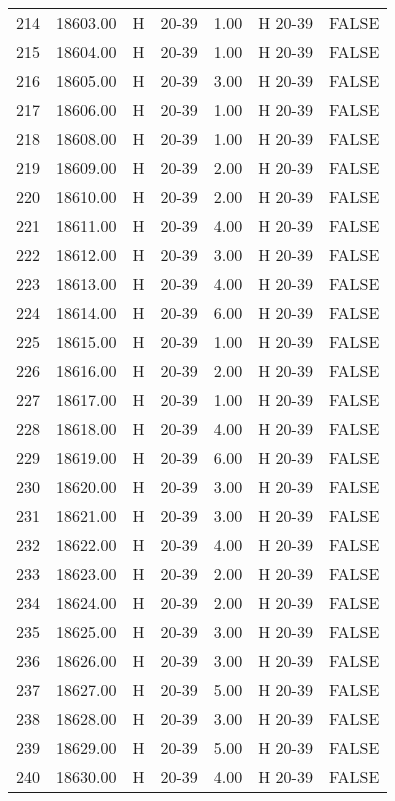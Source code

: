 \begin{table}[ht]
\begin{tabular}{rrllrll}
  214 & 18603.00 & H & 20-39 & 1.00 & H 20-39 & FALSE \\ 
  215 & 18604.00 & H & 20-39 & 1.00 & H 20-39 & FALSE \\ 
  216 & 18605.00 & H & 20-39 & 3.00 & H 20-39 & FALSE \\ 
  217 & 18606.00 & H & 20-39 & 1.00 & H 20-39 & FALSE \\ 
  218 & 18608.00 & H & 20-39 & 1.00 & H 20-39 & FALSE \\ 
  219 & 18609.00 & H & 20-39 & 2.00 & H 20-39 & FALSE \\ 
  220 & 18610.00 & H & 20-39 & 2.00 & H 20-39 & FALSE \\ 
  221 & 18611.00 & H & 20-39 & 4.00 & H 20-39 & FALSE \\ 
  222 & 18612.00 & H & 20-39 & 3.00 & H 20-39 & FALSE \\ 
  223 & 18613.00 & H & 20-39 & 4.00 & H 20-39 & FALSE \\ 
  224 & 18614.00 & H & 20-39 & 6.00 & H 20-39 & FALSE \\ 
  225 & 18615.00 & H & 20-39 & 1.00 & H 20-39 & FALSE \\ 
  226 & 18616.00 & H & 20-39 & 2.00 & H 20-39 & FALSE \\ 
  227 & 18617.00 & H & 20-39 & 1.00 & H 20-39 & FALSE \\ 
  228 & 18618.00 & H & 20-39 & 4.00 & H 20-39 & FALSE \\ 
  229 & 18619.00 & H & 20-39 & 6.00 & H 20-39 & FALSE \\ 
  230 & 18620.00 & H & 20-39 & 3.00 & H 20-39 & FALSE \\ 
  231 & 18621.00 & H & 20-39 & 3.00 & H 20-39 & FALSE \\ 
  232 & 18622.00 & H & 20-39 & 4.00 & H 20-39 & FALSE \\ 
  233 & 18623.00 & H & 20-39 & 2.00 & H 20-39 & FALSE \\ 
  234 & 18624.00 & H & 20-39 & 2.00 & H 20-39 & FALSE \\ 
  235 & 18625.00 & H & 20-39 & 3.00 & H 20-39 & FALSE \\ 
  236 & 18626.00 & H & 20-39 & 3.00 & H 20-39 & FALSE \\ 
  237 & 18627.00 & H & 20-39 & 5.00 & H 20-39 & FALSE \\ 
  238 & 18628.00 & H & 20-39 & 3.00 & H 20-39 & FALSE \\ 
  239 & 18629.00 & H & 20-39 & 5.00 & H 20-39 & FALSE \\ 
  240 & 18630.00 & H & 20-39 & 4.00 & H 20-39 & FALSE \\ 

\end{tabular}
\end{table}
